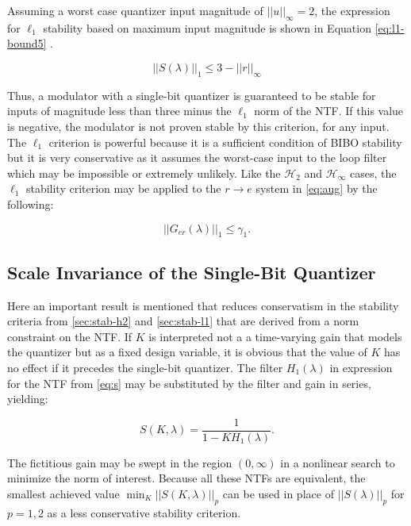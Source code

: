 Assuming a worst case quantizer input magnitude of $||u||_\infty = 2$, the expression for $\ell_1$ stability based on maximum input magnitude is shown in Equation \ref{eq:l1-bound5} \cite{Anastassiou1989}.

\begin{equation} 
	 ||S(\lambda)||_1 \leq 3 - ||r||_\infty \label{eq:l1-bound5}
\end{equation}

Thus, a modulator with a single-bit quantizer is guaranteed to be stable for inputs of magnitude less than three minus the $\ell_1$ norm of the NTF. If this value is negative, the modulator is not proven stable by this criterion, for any input. The $\ell_1$ criterion is powerful because it is a sufficient condition of \gls{BIBO} stability but it is very conservative as it assumes the worst-case input to the loop filter which may be impossible or extremely unlikely. Like the $\mathcal{H}_2$ and $\mathcal{H}_\infty$ cases, the $\ell_1$ stability criterion may be applied to the $r \rightarrow e$ system in \autoref{eq:aug} by the following:

\begin{equation}
	||G_{er}(\lambda)||_1 \leq \gamma_1. \label{eq:l1}
\end{equation}

\subsection{Scale Invariance of the Single-Bit Quantizer}
\label{sec:stab-si}

Here an important result is mentioned that reduces conservatism in the stability criteria from \autoref{sec:stab-h2} and \autoref{sec:stab-l1} that are derived from a norm constraint on the \gls{NTF}. If $K$ is interpreted not a a time-varying gain that models the quantizer but as a fixed design variable, it is obvious that the value of $K$ has no effect if it precedes the single-bit quantizer. The filter $H_1(\lambda)$ in expression for the \gls{NTF} from \autoref{eq:s} may be substituted by the filter and gain in series, yielding:

\begin{equation}
	S(K, \lambda) = \frac{1}{1 - KH_1(\lambda)}. \label{eq:scale-invariance}
\end{equation}

The fictitious gain may be swept in the region $(0, \infty)$ in a nonlinear search to minimize the norm of interest. Because all these \gls{NTF}s are equivalent, the smallest achieved value $\min_K ||S(K, \lambda)||_p$ can be used in place of $||S(\lambda)||_p$ for $p = 1, 2$ as a less conservative stability criterion.

